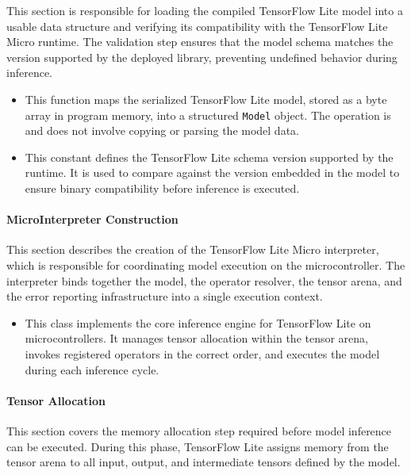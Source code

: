This section is responsible for loading the compiled TensorFlow Lite model into a usable data structure and verifying its compatibility with the TensorFlow Lite Micro runtime. The validation step ensures that the model schema matches the version supported by the deployed library, preventing undefined behavior during inference.

\begin{itemize}
	\item {} 
	
	This function maps the serialized TensorFlow Lite model, stored as a byte array in program memory, into a structured \texttt{Model} object. The operation is and does not involve copying or parsing the model data.
	
	\item {} 
	
	This constant defines the TensorFlow Lite schema version supported by the runtime. It is used to compare against the version embedded in the model to ensure binary compatibility before inference is executed.
\end{itemize}

\paragraph{MicroInterpreter Construction}

This section describes the creation of the TensorFlow Lite Micro interpreter, which is responsible for coordinating model execution on the microcontroller. The interpreter binds together the model, the operator resolver, the tensor arena, and the error reporting infrastructure into a single execution context.

\begin{itemize}
	\item {} 
	
	This class implements the core inference engine for TensorFlow Lite on microcontrollers. It manages tensor allocation within the tensor arena, invokes registered operators in the correct order, and executes the model during each inference cycle.
\end{itemize}


\paragraph{Tensor Allocation}

This section covers the memory allocation step required before model inference can be executed. During this phase, TensorFlow Lite assigns memory from the tensor arena to all input, output, and intermediate tensors defined by the model.

